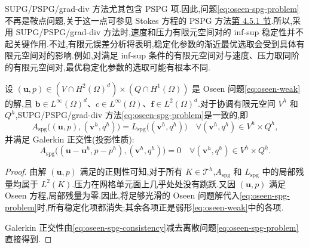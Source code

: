 \begin{note}\label{note:oseen-spg-infsup-pairs}
SUPG/PSPG/grad-div 方法尤其包含 PSPG 项.因此,问题\cref{eq:oseen-spg-problem}不再是鞍点问题,关于这一点可参见 Stokes 方程的 PSPG 方法\hyperref[note:stokes-pspg-introduction]{第 4.5.1 节}.所以,采用 SUPG/PSPG/grad-div 方法时,速度和压力有限元空间对的 inf-sup 稳定性并不起关键作用.不过,有限元误差分析将表明,稳定化参数的渐近最优选取会受到具体有限元空间对的影响.例如,对满足 inf-sup 条件的有限元空间对与速度、压力取同阶的有限元空间对,最优稳定化参数的选取可能有根本不同.
\end{note}

\begin{lemma}\label{lem:oseen-spg-consistency-orthogonality}
设 $(\bm{u},p)\in(V\cap H^2(\Omega)^d)\times(Q\cap H^1(\Omega))$ 是 Oseen 问题\cref{eq:oseen-weak}的解,且 $\bm{b}\in L^\infty(\Omega)^d$、$c\in L^\infty(\Omega)$、$\bm{f}\in L^2(\Omega)^d$.对于协调有限元空间 $V^h$ 和 $Q^h$,SUPG/PSPG/grad-div 方法\cref{eq:oseen-spg-problem}是一致的,即
\begin{equation}\label{eq:oseen-spg-consistency}
  A_{\mathrm{spg}}\bigl((\bm{u},p),(\bm{v}^h,q^h)\bigr)
   =L_{\mathrm{spg}}\bigl((\bm{v}^h,q^h)\bigr)
  \quad\forall(\bm{v}^h,q^h)\in V^h\times Q^h,
\end{equation}
并满足 Galerkin 正交性(投影性质):
\begin{equation}\label{eq:oseen-spg-galerkin-orthogonality}
  A_{\mathrm{spg}}\bigl((\bm{u}-\bm{u}^h,p-p^h),
                       (\bm{v}^h,q^h)\bigr)=0
  \quad\forall(\bm{v}^h,q^h)\in V^h\times Q^h.
\end{equation}
\end{lemma}
\begin{proof}
由解 $(\bm{u},p)$ 满足的正则性可知,对于所有 $K\in\mathcal{T}^h$,$A_{\mathrm{spg}}$ 和 $L_{\mathrm{spg}}$ 中的局部残量均属于 $L^2(K)$.压力在网格单元面上几乎处处没有跳跃.又因 $(\bm{u},p)$ 满足 Oseen 方程,局部残量为零.因此,将足够光滑的 Oseen 问题解代入\cref{eq:oseen-spg-problem}时,所有稳定化项都消失;其余各项正是弱形\cref{eq:oseen-weak}中的各项.

Galerkin 正交性由\cref{eq:oseen-spg-consistency}减去离散问题\cref{eq:oseen-spg-problem}直接得到.
\end{proof}

